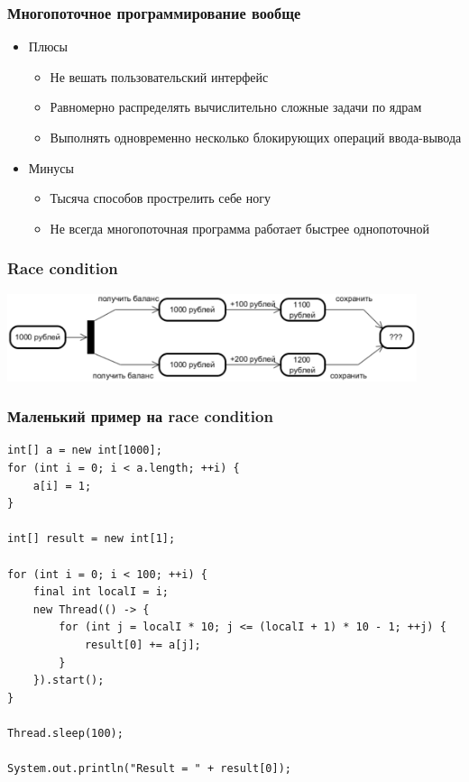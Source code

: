 \documentclass[xetex,mathserif,serif]{beamer}
\begin{document}
	\begin{frame}
		\frametitle{Многопоточное программирование вообще}
		\begin{itemize}
			\item Плюсы
			\begin{itemize}
				\item Не вешать пользовательский интерфейс
				\item Равномерно распределять вычислительно сложные задачи по ядрам
				\item Выполнять одновременно несколько блокирующих операций ввода-вывода
			\end{itemize}
			\item Минусы
			\begin{itemize}
				\item Тысяча способов прострелить себе ногу
				\item Не всегда многопоточная программа работает быстрее однопоточной
			\end{itemize}
		\end{itemize}
	\end{frame}

	\begin{frame}
		\frametitle{Race condition}
		\begin{center}
			\includegraphics[width=0.9\textwidth]{raceCondition.png}
		\end{center}
	\end{frame}

	\begin{frame}[fragile]
		\frametitle{Маленький пример на race condition}
		\begin{footnotesize}
			\begin{verbatim}
int[] a = new int[1000];
for (int i = 0; i < a.length; ++i) {
    a[i] = 1;
}

int[] result = new int[1];

for (int i = 0; i < 100; ++i) {
    final int localI = i;
    new Thread(() -> {
        for (int j = localI * 10; j <= (localI + 1) * 10 - 1; ++j) {
            result[0] += a[j];
        }
    }).start();
}

Thread.sleep(100);

System.out.println("Result = " + result[0]);
			\end{verbatim}
		\end{footnotesize}
	\end{frame}
\end{document}

